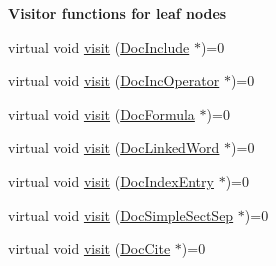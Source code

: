 \begin{Indent}{\bf Visitor functions for leaf nodes}
\begin{DoxyCompactItemize}
\item 
virtual void \hyperlink{class_doc_visitor_a983ff26fa96114015198c2f2b9cc9659}{visit} (\hyperlink{class_doc_include}{Doc\+Include} $\ast$)=0
\item 
virtual void \hyperlink{class_doc_visitor_acbd34843d9ac571f53484d80666553d6}{visit} (\hyperlink{class_doc_inc_operator}{Doc\+Inc\+Operator} $\ast$)=0
\item 
virtual void \hyperlink{class_doc_visitor_a4e27e470f439b296099f15e167fefdc7}{visit} (\hyperlink{class_doc_formula}{Doc\+Formula} $\ast$)=0
\item 
virtual void \hyperlink{class_doc_visitor_a02271e36b8c31ceddaa9a6cfe265866c}{visit} (\hyperlink{class_doc_linked_word}{Doc\+Linked\+Word} $\ast$)=0
\item 
virtual void \hyperlink{class_doc_visitor_a592d9b903b43b55af79a9511c2e4af76}{visit} (\hyperlink{class_doc_index_entry}{Doc\+Index\+Entry} $\ast$)=0
\item 
virtual void \hyperlink{class_doc_visitor_acb552de85678adcae6deaebeba33daec}{visit} (\hyperlink{class_doc_simple_sect_sep}{Doc\+Simple\+Sect\+Sep} $\ast$)=0
\item 
virtual void \hyperlink{class_doc_visitor_a493e4a1f2cd6e1d0ad5f9eb5b56089b1}{visit} (\hyperlink{class_doc_cite}{Doc\+Cite} $\ast$)=0
\end{DoxyCompactItemize}
\end{Indent}
